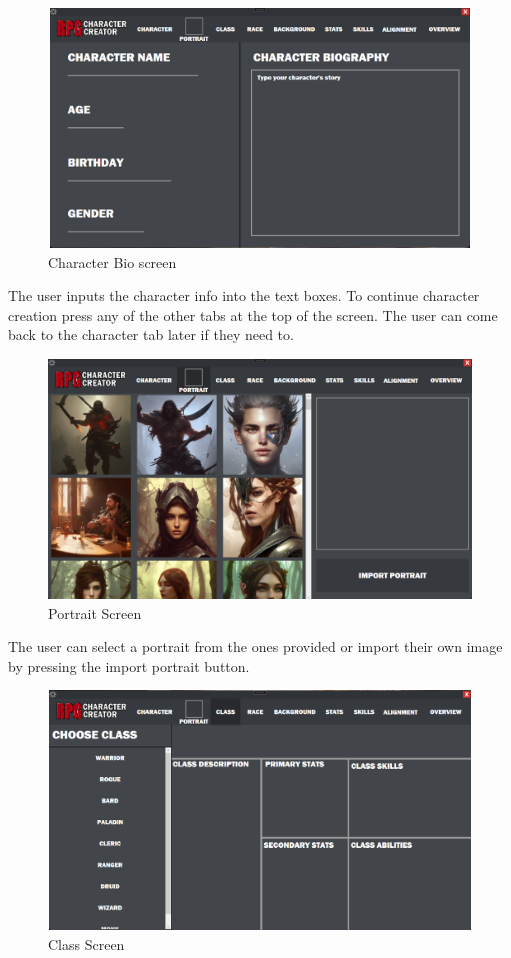 \documentclass[10pt,conference,onecolumn,compsoc]{IEEEtran}
\begin{document}
\begin{figure}[H]
\includegraphics[height=240px, width=426px]{Finished Interface/charInfoScreen.png}
\caption{Character Bio screen}
\centering
\end{figure}
The user inputs the character info into the text boxes. To continue character creation press any of the other tabs at the top of the screen. The user can come back to the character tab later if they need to.
\begin{figure}[H]
\includegraphics[height=240px, width=426px]{Finished Interface/portraitScreen.png}
\caption{Portrait Screen}
\centering
\end{figure}
The user can select a portrait from the ones provided or import their own image by pressing the import portrait button.
\begin{figure}[H]
\includegraphics[height=240px, width=426px]{Finished Interface/classScreen.png}
\caption{Class Screen}
\centering
\end{figure}
\end{document}
